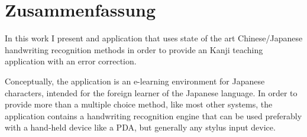 


\chapter*{Zusammenfassung}
\label{chap:zusammenfassung}
\pagestyle{empty}
\thispagestyle{empty}

In this work I present and application that uses state of the art 
Chinese/Japanese handwriting recognition methods in order to provide 
an Kanji teaching application with an error correction.

Conceptually, the application is an e-learning environment for Japanese 
characters, intended for the foreign learner of the Japanese language. 
In order to provide more than a  multiple choice method, like most other 
systems, the application contains a handwriting recognition engine that can
be used preferably with a hand-held device like a PDA, but generally any 
stylus input device.
